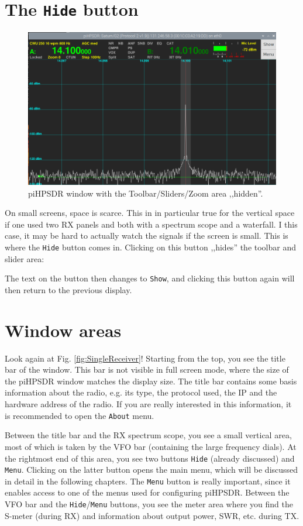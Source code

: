 \documentclass[12pt]{book}
\def\rett#1{\texttt{\color{red}#1}}
\def\bltt#1{\texttt{\color{blue}#1}}
\begin{document}
\section{The \texttt{Hide} button}
\begin{figure}[ht]
\center
\includegraphics[width=12cm]{Hidden.png}
\caption{piHPSDR window with the Toolbar/Sliders/Zoom
area ,,hidden''.}
\end{figure}

On small screens, space is scarce. This in in particular true
for the vertical space if one used two RX panels and both
with a spectrum scope and a waterfall. I this case, it may be
hard to actually watch the signals if the screen is small.
This is where the \rett{Hide} button comes in. Clicking on
this button ,,hides'' the toolbar and slider area:


The text on the button then changes to \rett{Show}, and
clicking this button again will then return to the
previous display.

\section{Window areas}

Look again at Fig. \ref{fig:SingleReceiver}! Starting from the
top, you see the title bar of the window. This bar is not visible
in full screen mode, where the size of the piHPSDR window matches
the display size. The title bar contains some basis information
about the radio, e.g.  its type, the protocol used, the  IP
and the hardware address of the radio. If you are really interested
in this information, it is recommended to open the
\bltt{About} menu.

Between the title bar and the RX spectrum scope, you see
a small vertical area, most of  which is taken by the VFO bar
(containing the large frequency dials). At the rightmost
end of this area, you see two buttons \rett{Hide} (already
discussed) and \rett{Menu}. Clicking on the latter button opens
the main menu, which will be discussed in detail in the following
chapters. The \rett{Menu} button is really important, since it
enables access to one of the menus used for configuring piHPSDR.
Between the VFO bar and the \rett{Hide}/\rett{Menu} buttons,
you see the meter area where you find the S-meter (during RX)
and information about output power, SWR, etc. during TX.
\end{document}
